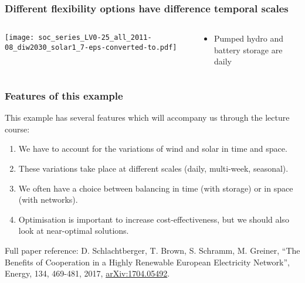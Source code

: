 \documentclass[10pt,aspectratio=169,dvipsnames]{beamer}
\let\olditem\item
\renewcommand{\item}{%
\olditem\vspace{5pt}}
\begin{document}
\begin{frame}
  \frametitle{Different flexibility options have difference temporal scales}

\begin{columns}[T]
  \begin{column}{10.5cm}

    \vspace{0.5cm}
  \texttt{[image: soc\_series\_LV0-25\_all\_2011-08\_diw2030\_solar1\_7-eps-converted-to.pdf]}

  \end{column}

  \begin{column}{3cm}
        \vspace{2cm}
    \begin{itemize}
    \item Pumped hydro and battery storage are \alert{daily}
    \end{itemize}

  \end{column}

\end{columns}
\end{frame}


\begin{frame}
  \frametitle{Features of this example}

  This example has several features which will accompany us through the lecture course:
  \begin{enumerate}
  \item We have to account for the variations of wind and solar in \alert{time} and \alert{space}.
  \item These variations take place at \alert{different scales} (daily, multi-week, seasonal).
  \item We often have a choice between balancing in \alert{time} (with storage) or in \alert{space} (with networks).
  \item Optimisation is important to increase cost-effectiveness, but
    we should also look at \alert{near-optimal} solutions.
  \end{enumerate}

  \vspace{1cm}
  Full paper reference: D. Schlachtberger, T. Brown, S. Schramm, M. Greiner, ``The Benefits of Cooperation in a Highly Renewable European Electricity Network'', Energy, 134, 469-481, 2017, \href{https://arxiv.org/abs/1704.05492}{arXiv:1704.05492}.
\end{frame}
\end{document}
